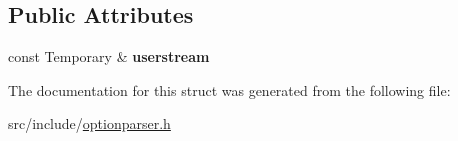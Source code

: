 \subsection*{Public Attributes}
\begin{DoxyCompactItemize}
\item 
\hypertarget{structxmem_1_1config_1_1third__party_1_1_print_usage_implementation_1_1_temporary_writer_ad77042b28c27077df291dae5021a5065}{const Temporary \& {\bfseries userstream}}\label{structxmem_1_1config_1_1third__party_1_1_print_usage_implementation_1_1_temporary_writer_ad77042b28c27077df291dae5021a5065}

\end{DoxyCompactItemize}


The documentation for this struct was generated from the following file\-:\begin{DoxyCompactItemize}
\item 
src/include/\hyperlink{optionparser_8h}{optionparser.\-h}\end{DoxyCompactItemize}
